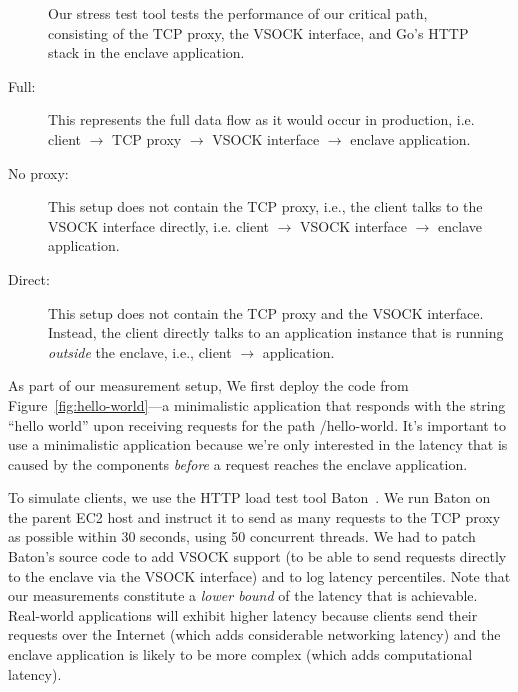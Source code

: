 \begin{figure}[t]
    \centering
    
    \caption{Our stress test tool tests the performance of our critical path,
    consisting of the TCP proxy, the VSOCK interface, and Go's HTTP stack in
    the enclave application.}
    \label{fig:stress-test}
\end{figure}

\begin{description}
  \item[Full:] This represents the full data flow as it would occur in
    production, i.e. client $\rightarrow$ TCP proxy $\rightarrow$ VSOCK
    interface $\rightarrow$ enclave application.

  \item[No proxy:] This setup does not contain the TCP proxy, i.e., the client
    talks to the VSOCK interface directly, i.e. client $\rightarrow$ VSOCK
    interface $\rightarrow$ enclave application.

  \item[Direct:] This setup does not contain the TCP proxy and the VSOCK
    interface.  Instead, the client directly talks to an application instance that is
    running \emph{outside} the enclave, i.e., client $\rightarrow$ application.
\end{description}

As part of our measurement setup, We first deploy the code from
Figure~\ref{fig:hello-world}---a minimalistic application that responds with
the string ``hello world'' upon receiving requests for the path /hello-world.
It's important to use a minimalistic application because we're only interested
in the latency that is caused by the components \emph{before} a request reaches
the enclave application.

To simulate clients, we use the HTTP load test tool Baton~\cite{baton}.  We run
Baton on the parent EC2 host and instruct it to send as many requests to the
TCP proxy as possible within 30 seconds, using 50 concurrent threads.  We had to
patch Baton's source code to add VSOCK support (to be able to send requests
directly to the enclave via the VSOCK interface) and to log latency
percentiles.  Note that our measurements constitute a \emph{lower bound} of the
latency that is achievable.  Real-world applications will exhibit higher latency
because clients send their requests over the Internet (which adds considerable
networking latency) and the enclave application is likely to be more complex
(which adds computational latency).

